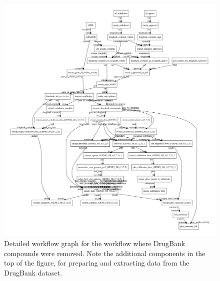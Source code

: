 \documentclass[10pt,article]{memoir}
\begin{document}
\begin{figure}[h]
\includegraphics[width=\textwidth]{figures/workflow_graph_wo_drugbank.pdf}
    \caption{Detailed workflow graph for the workflow where DrugBank compounds
    were removed. Note the additional components in the top of the figure, for
    preparing and extracting data from the DrugBank dataset.
    \label{fig:workflow_detailed_wo_drugbank}}
\end{figure}
\end{document}
